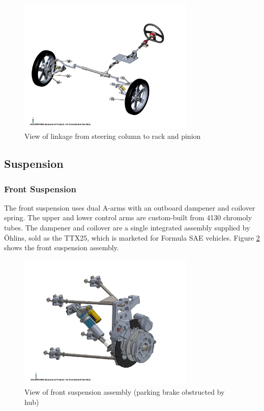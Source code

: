 \documentclass[10pt]{article}
\begin{document}
\begin{figure}
\centering
\includegraphics[width=0.75\textwidth]{figures/steering-assembly}
\caption{View of linkage from steering column to rack and pinion}
\label{fig:steering-assembly}
\end{figure}

\subsection{Suspension}
\subsubsection{Front Suspension}
The front suspension uses dual A-arms with an outboard dampener and coilover spring. The upper and lower control arms are custom-built from 4130 chromoly tubes. The dampener and coilover are a single integrated assembly supplied by \"Ohlins, sold as the TTX25, which is marketed for Formula SAE vehicles. Figure \ref{fig:front-suspension} shows the front suspension assembly.

\begin{figure}
\centering
\includegraphics[width=0.75\textwidth]{figures/front-suspension}
\caption{View of front suspension assembly (parking brake obstructed by hub)}
\label{fig:front-suspension}
\end{figure}
\end{document}
